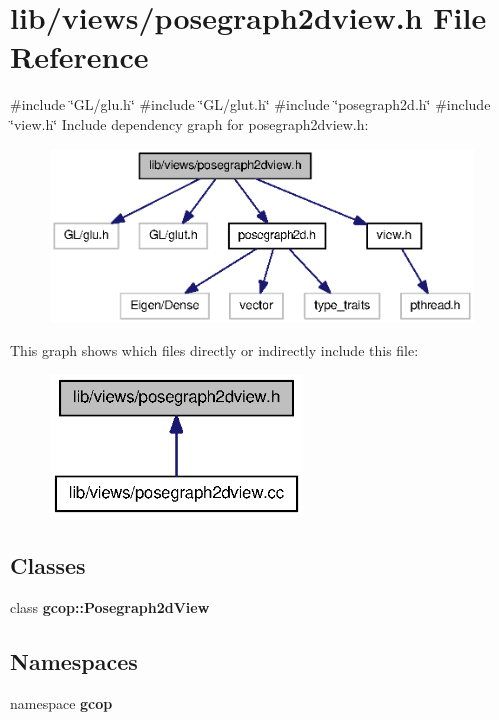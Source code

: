 \section{lib/views/posegraph2dview.h \-File \-Reference}
\label{posegraph2dview_8h}
{\ttfamily \#include \char`\"{}\-G\-L/glu.\-h\char`\"{}}\*
{\ttfamily \#include \char`\"{}\-G\-L/glut.\-h\char`\"{}}\*
{\ttfamily \#include \char`\"{}posegraph2d.\-h\char`\"{}}\*
{\ttfamily \#include \char`\"{}view.\-h\char`\"{}}\*
\-Include dependency graph for posegraph2dview.\-h\-:\nopagebreak
\begin{figure}[H]
\begin{center}
\leavevmode
\includegraphics[width=350pt]{posegraph2dview_8h__incl}
\end{center}
\end{figure}
\-This graph shows which files directly or indirectly include this file\-:\nopagebreak
\begin{figure}[H]
\begin{center}
\leavevmode
\includegraphics[width=190pt]{posegraph2dview_8h__dep__incl}
\end{center}
\end{figure}
\subsection*{\-Classes}
\begin{DoxyCompactItemize}
\item 
class {\bf gcop\-::\-Posegraph2d\-View}
\end{DoxyCompactItemize}
\subsection*{\-Namespaces}
\begin{DoxyCompactItemize}
\item 
namespace {\bf gcop}
\end{DoxyCompactItemize}
